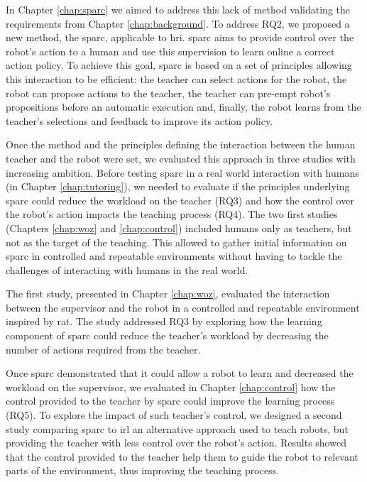In Chapter \ref{chap:sparc} we aimed to address this lack of method validating the requirements from Chapter \ref{chap:background}. To address RQ2, we proposed a new method, the \acrfull{sparc}, applicable to \gls{hri}. \gls{sparc} aims to provide control over the robot's action to a human and use this supervision to learn online a correct action policy. To achieve this goal, \gls{sparc} is based on a set of principles allowing this interaction to be efficient: the teacher can select actions for the robot, the robot can propose actions to the teacher, the teacher can pre-empt robot's propositions before an automatic execution and, finally, the robot learns from the teacher's selections and feedback to improve its action policy.

Once the method and the principles defining the interaction between the human teacher and the robot were set, we evaluated this approach in three studies with increasing ambition. Before testing \gls{sparc} in a real world interaction with humans (in Chapter \ref{chap:tutoring}), we needed to evaluate if the principles underlying \gls{sparc} could reduce the workload on the teacher (RQ3) and how the control over the robot's action impacts the teaching process (RQ4). The two first studies (Chapters \ref{chap:woz} and \ref{chap:control}) included humans only as teachers, but not as the target of the teaching. This allowed to gather initial information on \gls{sparc} in controlled and repeatable environments without having to tackle the challenges of interacting with humans in the real world.


The first study, presented in Chapter \ref{chap:woz}, evaluated the interaction between the supervisor and the robot in a controlled and repeatable environment inspired by \gls{rat}. The study addressed RQ3 by exploring how the learning component of \gls{sparc} could reduce the teacher's workload by decreasing the number of actions required from the teacher.

Once \gls{sparc} demonstrated that it could allow a robot to learn and decreased the workload on the supervisor, we evaluated in Chapter \ref{chap:control} how the control provided to the teacher by \gls{sparc} could improve the learning process (RQ5). To explore the impact of such teacher's control, we designed a second study comparing \gls{sparc} to \gls{irl} an alternative approach used to teach robots, but providing the teacher with less control over the robot's action. Results showed that the control provided to the teacher help them to guide the robot to relevant parts of the environment, thus improving the teaching process.

